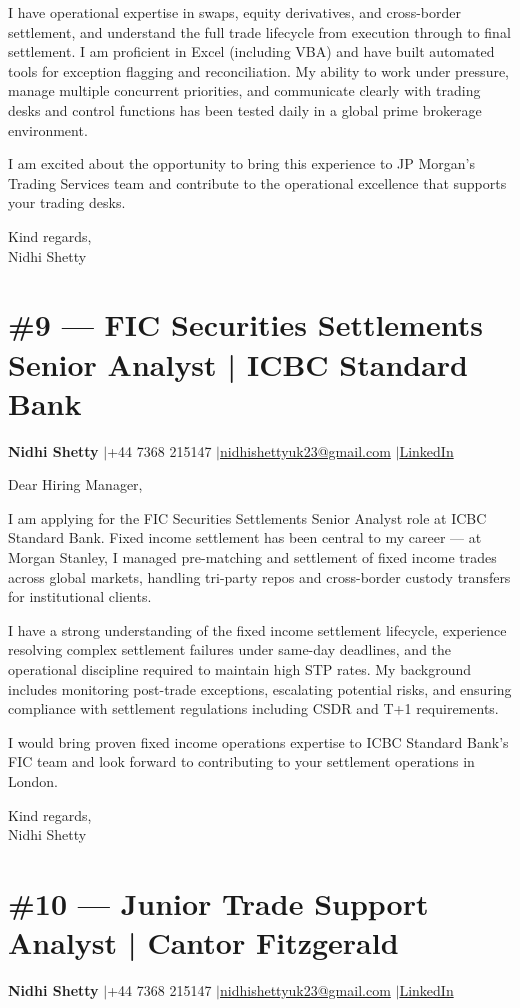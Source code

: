 \documentclass[11pt,a4paper]{article}
\makeatletter
\newcommand{\coverheader}{%
\begin{flushleft}
{\bfseries Nidhi Shetty} \enspace$\vert$\enspace +44 7368 215147 \enspace$\vert$\enspace \href{mailto:nidhishettyuk23@gmail.com}{nidhishettyuk23@gmail.com} \enspace$\vert$\enspace \href{https://www.linkedin.com/in/nidhi-shetty23-1841b7181}{LinkedIn}
\end{flushleft}
\vspace{4pt}
}
\makeatother
\begin{document}
I have operational expertise in swaps, equity derivatives, and cross-border settlement, and understand the full trade lifecycle from execution through to final settlement. I am proficient in Excel (including VBA) and have built automated tools for exception flagging and reconciliation. My ability to work under pressure, manage multiple concurrent priorities, and communicate clearly with trading desks and control functions has been tested daily in a global prime brokerage environment.

I am excited about the opportunity to bring this experience to JP Morgan's Trading Services team and contribute to the operational excellence that supports your trading desks.

\vspace{8pt}
Kind regards,\\
Nidhi Shetty

\newpage
\section{\#9 --- FIC Securities Settlements Senior Analyst | ICBC Standard Bank}
\coverheader

Dear Hiring Manager,

I am applying for the FIC Securities Settlements Senior Analyst role at ICBC Standard Bank. Fixed income settlement has been central to my career --- at Morgan Stanley, I managed pre-matching and settlement of fixed income trades across global markets, handling tri-party repos and cross-border custody transfers for institutional clients.

I have a strong understanding of the fixed income settlement lifecycle, experience resolving complex settlement failures under same-day deadlines, and the operational discipline required to maintain high STP rates. My background includes monitoring post-trade exceptions, escalating potential risks, and ensuring compliance with settlement regulations including CSDR and T+1 requirements.

I would bring proven fixed income operations expertise to ICBC Standard Bank's FIC team and look forward to contributing to your settlement operations in London.

\vspace{8pt}
Kind regards,\\
Nidhi Shetty

\newpage
\section{\#10 --- Junior Trade Support Analyst | Cantor Fitzgerald}
\coverheader
\end{document}
